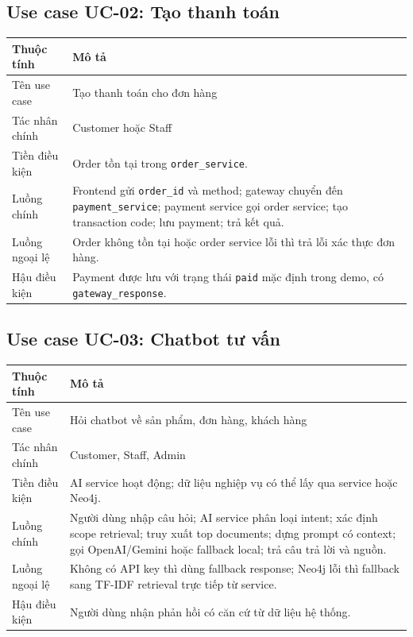 \documentclass[12pt,a4paper]{report}
\begin{document}
\subsection{Use case UC-02: Tạo thanh toán}
\begin{longtable}{p{3.4cm}p{10cm}}
\toprule
\textbf{Thuộc tính} & \textbf{Mô tả} \\
\midrule
Tên use case & Tạo thanh toán cho đơn hàng \\
Tác nhân chính & Customer hoặc Staff \\
Tiền điều kiện & Order tồn tại trong \texttt{order\_service}. \\
Luồng chính & Frontend gửi \texttt{order\_id} và method; gateway chuyển đến \texttt{payment\_service}; payment service gọi order service; tạo transaction code; lưu payment; trả kết quả. \\
Luồng ngoại lệ & Order không tồn tại hoặc order service lỗi thì trả lỗi xác thực đơn hàng. \\
Hậu điều kiện & Payment được lưu với trạng thái \texttt{paid} mặc định trong demo, có \texttt{gateway\_response}. \\
\bottomrule
\end{longtable}

\subsection{Use case UC-03: Chatbot tư vấn}
\begin{longtable}{p{3.4cm}p{10cm}}
\toprule
\textbf{Thuộc tính} & \textbf{Mô tả} \\
\midrule
Tên use case & Hỏi chatbot về sản phẩm, đơn hàng, khách hàng \\
Tác nhân chính & Customer, Staff, Admin \\
Tiền điều kiện & AI service hoạt động; dữ liệu nghiệp vụ có thể lấy qua service hoặc Neo4j. \\
Luồng chính & Người dùng nhập câu hỏi; AI service phân loại intent; xác định scope retrieval; truy xuất top documents; dựng prompt có context; gọi OpenAI/Gemini hoặc fallback local; trả câu trả lời và nguồn. \\
Luồng ngoại lệ & Không có API key thì dùng fallback response; Neo4j lỗi thì fallback sang TF-IDF retrieval trực tiếp từ service. \\
Hậu điều kiện & Người dùng nhận phản hồi có căn cứ từ dữ liệu hệ thống. \\
\bottomrule
\end{longtable}
\end{document}
